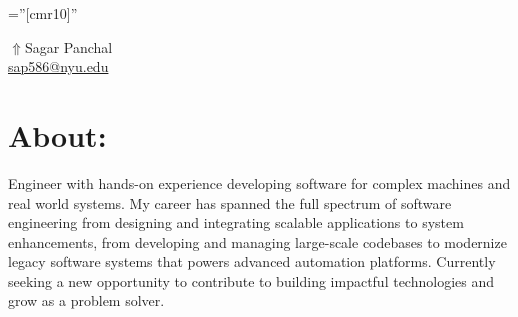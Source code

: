 \documentclass[a4paper]{article}
\newcommand{\SectionSize}{\large}
\begin{document}
\pagestyle{empty} 						%
\font\fb=''[cmr10]'' 						%

\centering
\href{https://sap586.github.io/Resume/}{$ \Uparrow$}{Sagar Panchal}	\\
\small \href{mailto:sap586@nyu.edu}{sap586@nyu.edu}					\\

\vspace{-0.8em}


\vspace{-2.5em} %
\parbox{1\linewidth}{
\section{\SectionSize{\textbf{About:}}}
\begin{justify}
{
{\color{currentWork}
Engineer with hands-on experience developing software for complex machines and real world systems. My career has spanned the full spectrum of software engineering from designing and integrating scalable applications to system enhancements, from developing and managing large-scale codebases to modernize legacy software systems that powers advanced automation platforms. Currently seeking a new opportunity to contribute to building impactful technologies and grow as a problem solver.
}
}
\end{justify}
}
\end{document}
